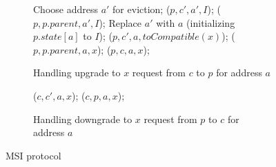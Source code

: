 \begin{figure}

\begin{subfigure}{\linewidth}
\begin{boxedminipage}{\linewidth}
\begin{algorithmic}
    \State Choose address $a'$ for eviction;
      \State \call{} \dReq($p , c', a', I$);
    \EndFor
    \State \call{} \dResp($p , p.parent, a', I$);
    \State Replace $a'$ with $a$ (initializing $p.state[a]$ to $I$);
  \EndIf
    \State \dReq($p , c', a, toCompatible(x)$);
  \EndFor
  \State \uReqL($p , p.parent, a, x$);
  \State \uResp($p , c, a, x$);
\EndProc
\end{algorithmic}
\end{boxedminipage}
\caption{Handling upgrade to $x$ request from $c$ to $p$ for address $a$}
\label{uReq}
\end{subfigure}

\begin{subfigure}{\linewidth}
\begin{boxedminipage}{\linewidth}
\begin{algorithmic}
    \State \dReqL($c , c', a, x$);
  \EndFor
  \State \dResp($c , p, a, x$);
\EndProc
\end{algorithmic}
\end{boxedminipage}
\caption{Handling downgrade to $x$ request from $p$ to $c$ for address $a$}
\label{dReq}
\end{subfigure}

\caption{MSI protocol}
\label{msi}
\end{figure}

